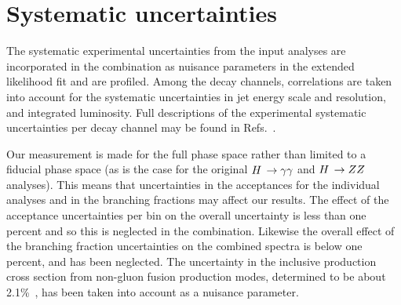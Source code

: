 \section{Systematic uncertainties}
\label{sec:systematics}

The systematic experimental uncertainties from the input analyses are incorporated in the combination as nuisance parameters in the extended likelihood fit and are profiled.
% 
Among the decay channels, correlations are taken into account for the systematic uncertainties in jet energy scale and resolution, and integrated luminosity.
% 
Full descriptions of the experimental systematic uncertainties per decay channel may be found in Refs.~\cite{CMS_AN_2017-299,CMS_AN_2016-442,CMS_AN_2016-366}.


Our measurement is made for the full phase space rather than limited to a fiducial phase space (as is the case for the original $H\,\to\gamma\gamma$ and $H\,\to ZZ$ analyses).
% 
This means that uncertainties in the acceptances for the individual analyses and in the branching fractions may affect our results.
% 
The effect of the acceptance uncertainties per bin on the overall uncertainty is less than one percent and so this is neglected in the combination.
% 
% 
Likewise the overall effect of the branching fraction uncertainties on the combined spectra is below one percent, and has been neglected.
% 
The uncertainty in the inclusive production cross section from non-gluon fusion production modes, determined to be about 2.1\%~\cite{deFlorian:2016spz}, has been taken into account as a nuisance parameter.
% 
% 
% 


